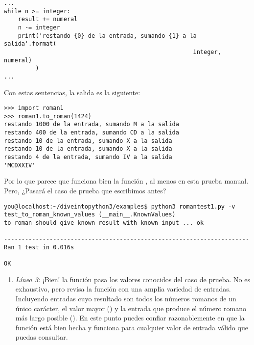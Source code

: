 \noindent\begin{minipage}{\textwidth}
\begin{lstlisting}[mathescape=True]
...
while n >= integer:
    result += numeral
    n -= integer
    print('restando {0} de la entrada, sumando {1} a la salida'.format(
                                                      integer, numeral)
         )
...
\end{lstlisting}
\end{minipage}

Con estas sentencias, la salida es la siguiente:

\noindent\begin{minipage}{\textwidth}
\begin{lstlisting}[mathescape=True]
>>> import roman1
>>> roman1.to_roman(1424)
restando 1000 de la entrada, sumando M a la salida
restando 400 de la entrada, sumando CD a la salida
restando 10 de la entrada, sumando X a la salida
restando 10 de la entrada, sumando X a la salida
restando 4 de la entrada, sumando IV a la salida
'MCDXXIV'
\end{lstlisting}
\end{minipage}

Por lo que parece que funciona bien la función , al menos en esta prueba manual. Pero, ¿Pasará el caso de prueba que escribimos antes?

\noindent\begin{minipage}{\textwidth}
\begin{lstlisting}[mathescape=False]
you@localhost:~/diveintopython3/examples$ python3 romantest1.py -v
test_to_roman_known_values (__main__.KnownValues)
to_roman should give known result with known input ... ok

----------------------------------------------------------------------
Ran 1 test in 0.016s

OK
\end{lstlisting}
\end{minipage}

\begin{enumerate}

\item \emph{Línea 3:} ¡Bien! la función  pasa los valores conocidos del caso de prueba. No es exhaustivo, pero revisa la función con una amplia variedad de entradas. Incluyendo entradas cuyo resultado son todos los números romanos de un único carácter, el valor mayor () y la entrada que produce el número romano más largo posible (). En este punto puedes confiar razonablemente en que la función está bien hecha y funciona para cualquier valor de entrada válido que puedas consultar.

\end{enumerate}


